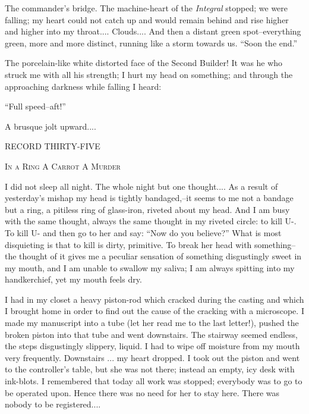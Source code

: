 \documentclass[11pt,openany]{book}
\begin{document}
The commander's bridge. The machine-heart of the \emph{Integral} stopped; we were falling; my heart could not catch up and would remain behind and rise higher and higher into my throat.... Clouds.... And then a distant green spot--everything green, more and more distinct, running like a storm towards us. ``Soon the end.''

The porcelain-like white distorted face of the Second Builder! It was he who struck me with all his strength; I hurt my head on something; and through the approaching darkness while falling I heard:

``Full speed--aft!''

A brusque jolt upward....

\begin{center}\textsc{RECORD THIRTY-FIVE}\end{center}

\begin{center}\textsc{In a Ring A Carrot A Murder}\end{center}

I did not sleep all night. The whole night but one thought.... As a result of yesterday's mishap my head is tightly bandaged,--it seems to me not a bandage but a ring, a pitiless ring of glass-iron, riveted about my head. And I am busy with the same thought, always the same thought in my riveted circle: to kill U-. To kill U- and then go to her and say: ``Now do you believe?'' What is most disquieting is that to kill is dirty, primitive. To break her head with something--the thought of it gives me a peculiar sensation of something disgustingly sweet in my mouth, and I am unable to swallow my saliva; I am always spitting into my handkerchief, yet my mouth feels dry.

I had in my closet a heavy piston-rod which cracked during the casting and which I brought home in order to find out the cause of the cracking with a microscope. I made my manuscript into a tube (let her read me to the last letter!), pushed the broken piston into that tube and went downstairs. The stairway seemed endless, the steps disgustingly slippery, liquid. I had to wipe off moisture from my mouth very frequently. Downstairs ... my heart dropped. I took out the piston and went to the controller's table, but she was not there; instead an empty, icy desk with ink-blots. I remembered that today all work was stopped; everybody was to go to be operated upon. Hence there was no need for her to stay here. There was nobody to be registered....
\end{document}
